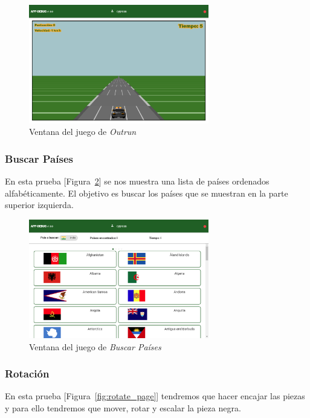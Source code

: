 \begin{figure}[!h]
    \centering
    \includegraphics[width=0.7\textwidth, keepaspectratio]{imaxes/application/outrun-page.png}
    \caption{Ventana del juego de \textit{Outrun}}
    \label{fig:outrun_page}
\end{figure}

\subsubsection{Buscar Países}
En esta prueba [Figura~\ref{fig:search_page}] se nos muestra una lista de países ordenados alfabéticamente. El objetivo es buscar los países que se muestran en la parte superior izquierda.

\begin{figure}[!h]
    \centering
    \includegraphics[width=0.7\textwidth, keepaspectratio]{imaxes/application/search-page.png}
    \caption{Ventana del juego de \textit{Buscar Países}}
    \label{fig:search_page}
\end{figure}

\subsubsection{Rotación}
En esta prueba [Figura~\ref{fig:rotate_page}] tendremos que hacer encajar las piezas y para ello tendremos que mover, rotar y escalar la pieza negra.

